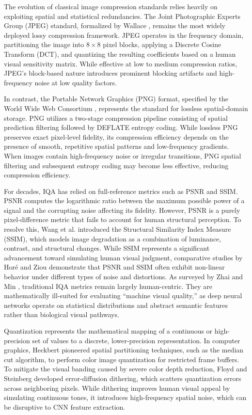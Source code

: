 \documentclass[12pt, a4paper]{article}
\begin{document}
The evolution of classical image compression standards relies heavily on exploiting spatial and statistical redundancies. The Joint Photographic Experts Group (JPEG) standard, formalized by Wallace \cite{wallace1992}, remains the most widely deployed lossy compression framework. JPEG operates in the frequency domain, partitioning the image into $8\times8$ pixel blocks, applying a Discrete Cosine Transform (DCT), and quantizing the resulting coefficients based on a human visual sensitivity matrix. While effective at low to medium compression ratios, JPEG's block-based nature introduces prominent blocking artifacts and high-frequency noise at low quality factors.

In contrast, the Portable Network Graphics (PNG) format, specified by the World Wide Web Consortium \cite{w3c2003}, represents the standard for lossless spatial-domain storage. PNG utilizes a two-stage compression pipeline consisting of spatial prediction filtering followed by DEFLATE entropy coding. While lossless PNG preserves exact pixel-level fidelity, its compression efficiency depends on the presence of smooth, repetitive spatial patterns and low-frequency gradients. When images contain high-frequency noise or irregular transitions, PNG spatial filtering and subsequent entropy coding may become less effective, reducing compression efficiency.

For decades, IQA has relied on full-reference metrics such as PSNR and SSIM. PSNR computes the logarithmic ratio between the maximum possible power of a signal and the corrupting noise affecting its fidelity. However, PSNR is a purely pixel-difference metric that fails to account for human structural perception. To resolve this, Wang et al. \cite{wang2004} introduced the Structural Similarity Index Measure (SSIM), which models image degradation as a combination of luminance, contrast, and structural changes. While SSIM represents a significant advancement toward simulating human visual judgment, comparative studies by Horé and Ziou \cite{hore2010} demonstrate that PSNR and SSIM often exhibit non-linear behavior under different types of noise and distortions. As surveyed by Zhai and Min \cite{zhai2020}, traditional IQA metrics remain largely human-centric. They are mathematically ill-suited for evaluating ``machine visual quality,'' as deep neural networks operate on statistical distributions and abstract semantic features rather than biological visual pathways.

Quantization represents the mathematical mapping of a continuous or high-precision set of values to a discrete, lower-precision representation. In computer graphics, Heckbert \cite{heckbert1982} pioneered spatial partitioning techniques, such as the median cut algorithm, to perform color image quantization for restricted frame buffers. To mitigate the visual banding caused by severe color depth reduction, Floyd and Steinberg \cite{floyd1976} developed error-diffusion dithering, which scatters quantization errors across neighboring pixels. While dithering improves human visual appeal by simulating continuous tones, it introduces high-frequency spatial noise, which can be disruptive to CNN feature extraction.
\end{document}

